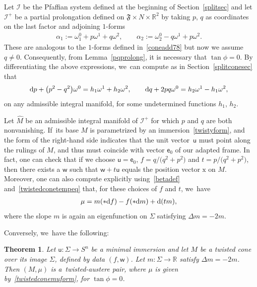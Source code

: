 \documentclass[10pt,a4paper]{amsart}
\def\R{\mathbb{R}}
\def\ve{\mathsf{e}}
\def\vx{\boldsymbol{\mathrm{x}}}
\def\vw{\mathsf{w}}
\def\vu{\mathsf{u}}
\def\F{\mathfrak{F}}
\def\calI{\mathcal{I}}
\def\w{\omega}
\def\Mhat{\widehat{M}}
\newtheorem{Theorem}{Theorem}[section]
\numberwithin{equation}{section}
\begin{document}
Let $\calI$ be the Pfaffian system defined at the beginning of Section~\ref{splitsec} and let $\calI^+$ be a partial prolongation defined on $\F \times N \times \R^2$ by taking $p$, $q$ as coordinates on the last factor and adjoining $1$-forms
\begin{gather*}
\alpha_1 := \w^0_1 + p \w^1 + q\w^2 , \qquad \alpha_2 := \w^0_2 -q\w^1+ p\w^2.
\end{gather*}
These are analogous to the $1$-forms defined in~\eqref{coneadd78} but now we assume $q\ne 0$. Consequently, from Lemma~\ref{pqprolong}, it is necessary that $\tan\phi=0$. By differentiating the above expressions, we~can compute as in Section~\ref{splitconesec} that
\begin{gather} \label{twistedconetempeq}
{\rm d}p + \big(p^2 - q^2\big) \w^0 = h_1 \w^1 + h_2 \w^2, \qquad
{\rm d}q + 2pq \w^0 = h_2 \w^1 - h_1 \w^2,
\end{gather}
on any admissible integral manifold, for some undetermined functions $h_1$, $h_2$.

Let $\Mhat$ be an admissible integral manifold of $\calI^+$ for which $p$ and $q$ are both nonvanishing. If~its base $M$ is parametrized by an immersion~\eqref{twistyform}, and the form of the right-hand side indicates that the unit vector~$\vu$ must point along the rulings of $M$, and thus must coincide with vector $\ve_0$ of our adapted frame. In fact, one can check that if we choose $\vu= \ve_0$, $f=q/\big(q^2+p^2\big)$ and $t=p/\big(q^2+p^2\big)$, then there exists a $\vw$ such that $\vw + t \vu$ equals the position vector $\vx$ on $M$. Moreover, one can also compute explicitly using~\eqref{betadef} and~\eqref{twistedconetempeq} that, for these choices of $f$ and $t$, we~have
\begin{gather} \label{twistedconemuform}
\mu = m (*{\rm d}f) - f (*{\rm d}m) + {\rm d}(tm),
\end{gather}
where the slope $m$ is again an eigenfunction on $\Sigma$ satisfying $\Delta m = -2m$.

Conversely, we~have the following:
\begin{Theorem}
Let $\vu\colon\Sigma \to S^n$ be a minimal immersion and let $M$ be a twisted
cone over its image $\Sigma$, defined by data $(f,\vw)$. Let $m\colon\Sigma \to \R$ satisfy
$\Delta m =-2m$. Then $(M,\mu)$ is a~twi\-s\-ted-austere pair, where $\mu$ is given by~\eqref{twistedconemuform}, for $\tan\phi=0$.
\end{Theorem}
\end{document}
